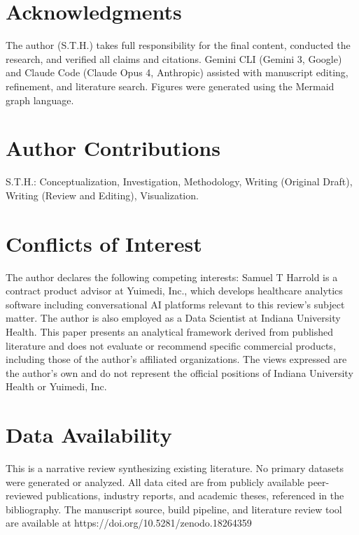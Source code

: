 \documentclass[
  american,
  11pt,
  letterpaper,
  oneside  ,captions=tableheading
]{scrartcl}
\begin{document}
\section{Acknowledgments}\label{acknowledgments}

The author (S.T.H.) takes full responsibility for the final content,
conducted the research, and verified all claims and citations. Gemini
CLI (Gemini 3, Google) and Claude Code (Claude Opus 4, Anthropic)
assisted with manuscript editing, refinement, and literature search.
Figures were generated using the Mermaid graph language.

\section{Author Contributions}\label{author-contributions}

S.T.H.: Conceptualization, Investigation, Methodology, Writing (Original
Draft), Writing (Review and Editing), Visualization.

\section{Conflicts of Interest}\label{conflicts-of-interest}

The author declares the following competing interests: Samuel T Harrold
is a contract product advisor at Yuimedi, Inc., which develops
healthcare analytics software including conversational AI platforms
relevant to this review's subject matter. The author is also employed as
a Data Scientist at Indiana University Health. This paper presents an
analytical framework derived from published literature and does not
evaluate or recommend specific commercial products, including those of
the author's affiliated organizations. The views expressed are the
author's own and do not represent the official positions of Indiana
University Health or Yuimedi, Inc.

\section{Data Availability}\label{data-availability}

This is a narrative review synthesizing existing literature. No primary
datasets were generated or analyzed. All data cited are from publicly
available peer-reviewed publications, industry reports, and academic
theses, referenced in the bibliography. The manuscript source, build
pipeline, and literature review tool are available at
https://doi.org/10.5281/zenodo.18264359
\end{document}
